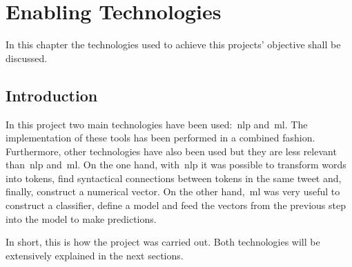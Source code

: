 \chapter{Enabling Technologies}
\label{chap:entech}


In this chapter the technologies used to achieve this projects' objective shall be discussed.

\section{Introduction}\par
In this project two main technologies have been used:~\acf{nlp}  and~\acf{ml}. The implementation of these tools has been performed in a combined fashion. Furthermore, other technologies have also been used but they are less relevant than~\ac{nlp} and~\ac{ml}.
On the one hand, with~\ac{nlp} it was possible to transform words into tokens, find syntactical connections between tokens in the same tweet and, finally, construct a numerical vector. On the other hand,~\ac{ml} was very useful to construct a classifier, define a model and feed the vectors from the previous step into the model to make predictions.\par
In short, this is how the project was carried out. Both technologies will be extensively explained in the next sections.

